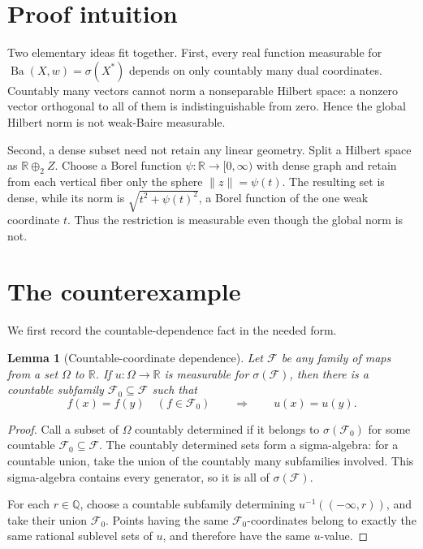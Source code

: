 \documentclass[11pt]{article}
\newtheorem{lemma}{Lemma}
\theoremstyle{remark}
\newcommand{\Ba}{\operatorname{Ba}}
\newcommand{\R}{\mathbb{R}}
\newcommand{\Q}{\mathbb{Q}}
\newcommand{\norm}[1]{\lVert #1\rVert}
\begin{document}
\section{Proof intuition}

Two elementary ideas fit together.  First, every real function measurable
for \(\Ba(X,w)=\sigma(X^*)\) depends on only countably many dual
coordinates.  Countably many vectors cannot norm a nonseparable Hilbert
space: a nonzero vector orthogonal to all of them is indistinguishable from
zero.  Hence the global Hilbert norm is not weak-Baire measurable.

Second, a dense subset need not retain any linear geometry.  Split a Hilbert
space as \(\R\oplus_2 Z\).  Choose a Borel function
\(\psi:\R\to[0,\infty)\) with dense graph and retain from each vertical
fiber only the sphere \(\norm{z}=\psi(t)\).  The resulting set is dense, while
its norm is \(\sqrt{t^2+\psi(t)^2}\), a Borel function of the one weak
coordinate \(t\).  Thus the restriction is measurable even though the
global norm is not.

\section{The counterexample}

We first record the countable-dependence fact in the needed form.

\begin{lemma}[Countable-coordinate dependence]\label{lem:countable}
Let \(\mathcal F\) be any family of maps from a set \(\Omega\) to \(\R\).
If \(u:\Omega\to\R\) is measurable for \(\sigma(\mathcal F)\), then there is
a countable subfamily \(\mathcal F_0\subseteq\mathcal F\) such that
\[
 f(x)=f(y)\quad(f\in\mathcal F_0)
 \qquad\Longrightarrow\qquad u(x)=u(y).
\]
\end{lemma}

\begin{proof}
Call a subset of \(\Omega\) countably determined if it belongs to
\(\sigma(\mathcal F_0)\) for some countable
\(\mathcal F_0\subseteq\mathcal F\).  The countably determined sets form a
sigma-algebra: for a countable union, take the union of the countably many
subfamilies involved.  This sigma-algebra contains every generator, so it is
all of \(\sigma(\mathcal F)\).

For each \(r\in\Q\), choose a countable subfamily determining
\(u^{-1}((-\infty,r))\), and take their union \(\mathcal F_0\).  Points having
the same \(\mathcal F_0\)-coordinates belong to exactly the same rational
sublevel sets of \(u\), and therefore have the same \(u\)-value.
\end{proof}
\end{document}
